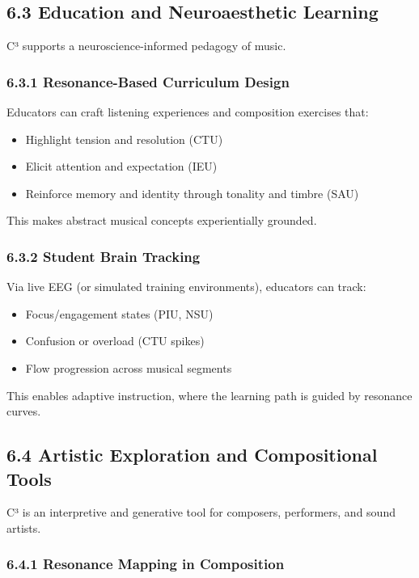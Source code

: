 \documentclass[10pt]{article}
\begin{document}
\subsection*{6.3 Education and Neuroaesthetic Learning}

C³ supports a neuroscience-informed pedagogy of music.

\subsubsection*{6.3.1 Resonance-Based Curriculum Design}

Educators can craft listening experiences and composition exercises that:

\begin{itemize}
    \item Highlight tension and resolution (CTU)
    \item Elicit attention and expectation (IEU)
    \item Reinforce memory and identity through tonality and timbre (SAU)
\end{itemize}

This makes abstract musical concepts experientially grounded.

\subsubsection*{6.3.2 Student Brain Tracking}

Via live EEG (or simulated training environments), educators can track:

\begin{itemize}
    \item Focus/engagement states (PIU, NSU)
    \item Confusion or overload (CTU spikes)
    \item Flow progression across musical segments
\end{itemize}

This enables adaptive instruction, where the learning path is guided by resonance curves.

\subsection*{6.4 Artistic Exploration and Compositional Tools}

C³ is an interpretive and generative tool for composers, performers, and sound artists.

\subsubsection*{6.4.1 Resonance Mapping in Composition}
\end{document}
